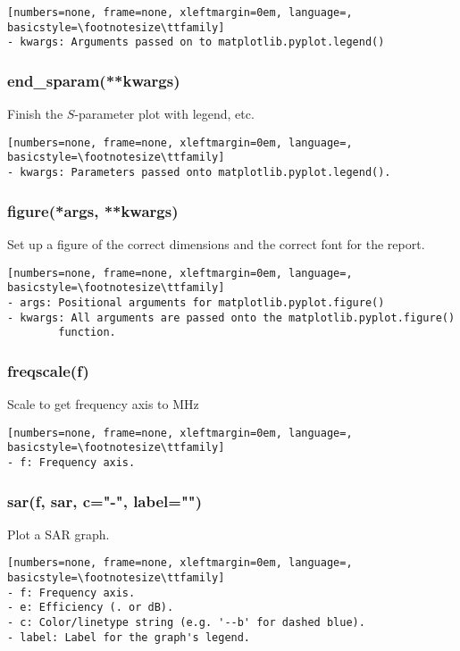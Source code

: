 \begin{lstlisting}[numbers=none, frame=none, xleftmargin=0em, language=, basicstyle=\footnotesize\ttfamily]
- kwargs: Arguments passed on to matplotlib.pyplot.legend()
\end{lstlisting}

\subsubsection{end\_sparam(**kwargs)}
Finish the $S$-parameter plot with legend, etc.

\begin{lstlisting}[numbers=none, frame=none, xleftmargin=0em, language=, basicstyle=\footnotesize\ttfamily]
- kwargs: Parameters passed onto matplotlib.pyplot.legend().
\end{lstlisting}

\subsubsection{figure(*args, **kwargs)}
Set up a figure of the correct dimensions and the correct font for the
report.

\begin{lstlisting}[numbers=none, frame=none, xleftmargin=0em, language=, basicstyle=\footnotesize\ttfamily]
- args: Positional arguments for matplotlib.pyplot.figure()
- kwargs: All arguments are passed onto the matplotlib.pyplot.figure()
        function.
\end{lstlisting}

\subsubsection{freqscale(f)}
Scale to get frequency axis to MHz

\begin{lstlisting}[numbers=none, frame=none, xleftmargin=0em, language=, basicstyle=\footnotesize\ttfamily]
- f: Frequency axis.
\end{lstlisting}

\subsubsection{sar(f, sar, c="-", label="")}
Plot a SAR graph.

\begin{lstlisting}[numbers=none, frame=none, xleftmargin=0em, language=, basicstyle=\footnotesize\ttfamily]
- f: Frequency axis.
- e: Efficiency (. or dB).
- c: Color/linetype string (e.g. '--b' for dashed blue).
- label: Label for the graph's legend.
\end{lstlisting}


